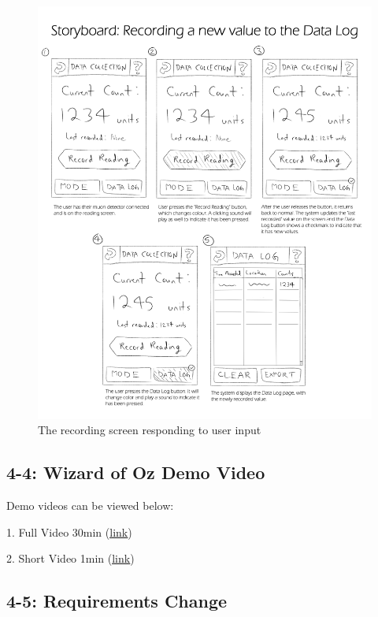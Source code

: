 \documentclass[11pt,a4paper]{article}
\begin{document}
\bigskip
\begin{figure}[h]
  \centering
  \hspace*{-0.5cm}
      \includegraphics[width=1.15\textwidth]{storyboard.png}
  \caption{The recording screen responding to user input}
\end{figure}

\newpage
\subsection*{4-4: Wizard of Oz Demo Video}

Demo videos can be viewed below:

1. Full Video 30min (\href{https://drive.google.com/file/d/1D5OwAUCmAK5fYUDqaYs4WdFURqq9lxwS/view}{\underline{link}})

2. Short Video 1min (\href{https://drive.google.com/file/d/1GZPQ2MqETNLw6sNSMTrlxhX4ftYG58Hb/view?usp=sharing}{\underline{link}})



\subsection*{4-5: Requirements Change}
\end{document}
